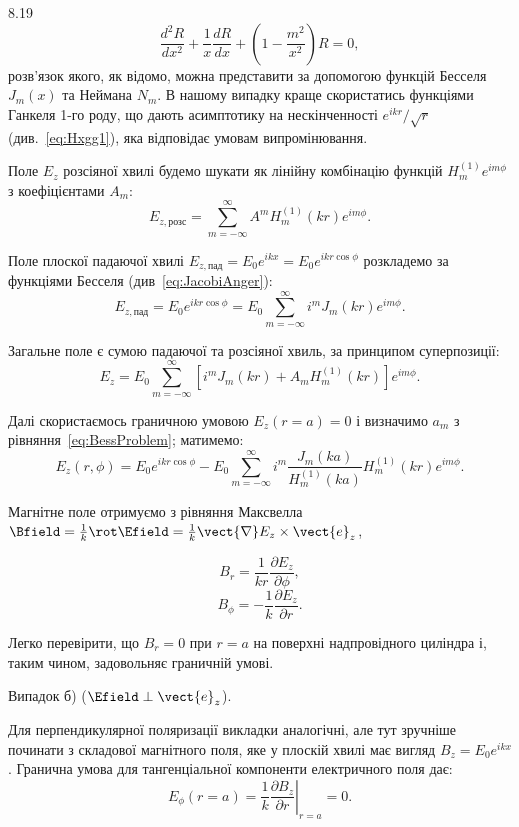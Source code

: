 \begin{Solution}{8.{19}}
	\begin{equation}\label{eq:BessProblem}\tag{*}
		\frac{d^2R}{dx^2} + \frac1x\frac{dR}{dx} + \left(1 - \frac{m^2}{x^2} \right) R = 0,
	\end{equation}
	розв'язок якого, як відомо, можна представити за допомогою функцій Бесселя $J_m(x)$ та Неймана
	$N_m$.
	В нашому випадку краще скористатись функціями Ганкеля 1-го роду, що дають асимптотику на
	нескінченності $e^{ikr}/\sqrt{r}$ (див.~\eqref{eq:Hxgg1}), яка відповідає умовам випромінювання.

	Поле  $E_z$ розсіяної хвилі будемо шукати як  лінійну комбінацію функцій $H_m^{(1)}e^{im\phi}$ з
	коефіцієнтами $A_m$:
	\[
		E_{z,\text{розс}} =  \sum\limits_{m = -\infty}^{\infty} A^m H^{(1)}_m(k r)e^{im\phi}.
	\]

	Поле плоскої падаючої хвилі $ E_{z,\text{пад}} = E_0e^{ikx} = E_0e^{ikr\cos\phi}$ розкладемо за
	функціями Бесселя (див~\eqref{eq:JacobiAnger}):
	\[
		E_{z,\text{пад}} =  E_0e^{ikr\cos\phi} =  E_0 \sum\limits_{m = -\infty}^{\infty} i^m J_m(k
		r)e^{im\phi}.
	\]

	Загальне поле є сумою падаючої та розсіяної хвиль, за принципом суперпозиції:
	\[
		E_z = E_0 \sum\limits_{m = -\infty}^{\infty}[ i^mJ_m(kr) + A_mH^{(1)}_m(kr)]e^{im\phi}.
	\]

	Далі скористаємось граничною умовою $E_z(r = a) = 0$  і визначимо $a_m$ з
	рівняння~\eqref{eq:BessProblem}; матимемо:
	\[
		E_z(r,\phi) = E_0e^{ikr\cos\phi} - E_0\sum\limits_{m = -\infty}^{\infty} i^m
		\frac{J_m(ka)}{H_m^{(1)}(ka)}H_m^{(1)}(kr)e^{im\phi}.
	\]

	Магнітне поле отримуємо з рівняння Максвелла $\Bfield = \frac1k\rot\Efield = \frac1k
	\vect{\nabla}E_z\times \vect{e}_z$,

	\[
		B_r=\frac{1}{kr}\frac{\partial E_z}{\partial \phi},
	\]
	\[
		B_\phi=-\frac{1}{k}\frac{\partial E_z}{\partial r}.
	\]

	Легко  перевірити, що $B_r=0$ при $r=a$ на  поверхні надпровідного циліндра і, таким чином,
	задовольняє граничній умові.

	Випадок б) ($\Efield \perp \vect{e}_z$).

	Для перпендикулярної поляризації викладки аналогічні, але тут зручніше починати з складової
	магнітного поля, яке у плоскій хвилі має вигляд $B_z = E_0e^{ikx}$. Гранична умова для
	тангенціальної компоненти електричного поля дає:
	\[
		E_{\phi}(r = a) = \left. \frac1k\frac{\partial B_z}{\partial r}\right|_{r = a} = 0.
	\]


\end{Solution}
